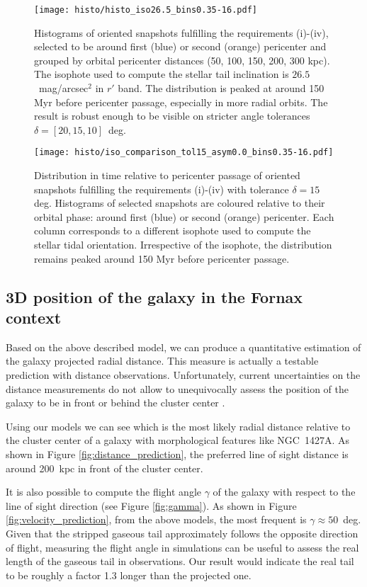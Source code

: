 \begin{figure}
\centering
\texttt{[image: histo/histo\_iso26.5\_bins0.35-16.pdf]}
\caption{Histograms of oriented snapshots fulfilling the requirements (i)-(iv), selected to be around first (blue) or second (orange) pericenter and grouped by orbital pericenter distances (50, 100, 150, 200, 300 kpc).
The isophote used to compute the stellar tail inclination is $26.5$~mag/arcsec$^2$ in $r'$ band.
The distribution is peaked at around 150 Myr before pericenter passage, especially in more radial orbits. The result is robust enough to be visible on stricter angle tolerances $\delta = [20, 15, 10]$~deg.
}
\label{fig:histo_peri}
\end{figure}

\begin{figure}
\centering
\texttt{[image: histo/iso\_comparison\_tol15\_asym0.0\_bins0.35-16.pdf]}
\caption{Distribution in time relative to pericenter passage of oriented snapshots fulfilling the requirements (i)-(iv) with tolerance $\delta=15$ deg.
Histograms of selected snapshots are coloured relative to their orbital phase: around first (blue) or second (orange) pericenter.
Each column corresponds to a different isophote used to compute the stellar tidal orientation.
Irrespective of the isophote, the distribution remains peaked  around 150 Myr before pericenter passage.}
\label{fig:histo_noperi}
\end{figure}

\subsection{3D position of the galaxy in the Fornax context}

Based on the above described model, we can produce a quantitative estimation of the galaxy projected radial distance. This measure is actually a testable prediction with distance observations.
Unfortunately, current uncertainties on the distance measurements do not allow to unequivocally assess the position of the galaxy to be in front or behind the cluster center \citep{Georgiev2006}.

Using our models we can see which is the most likely radial distance relative to the cluster center of a galaxy with morphological features like NGC~1427A.
As shown in Figure \ref{fig:distance_prediction}, the preferred line of sight distance is around 200~kpc in front of the cluster center.

It is also possible to compute the flight angle $\gamma$ of the galaxy with respect to the line of sight direction (see Figure \ref{fig:gamma}).
As shown in Figure \ref{fig:velocity_prediction}, from the above models, the most frequent is $\gamma\approx 50$~deg.
Given that the stripped gaseous tail approximately follows the opposite direction of flight, measuring the flight angle in simulations can be useful to assess the real length of the gaseous tail in observations.
Our result would indicate the real tail to be roughly a factor 1.3 longer than the projected one.

